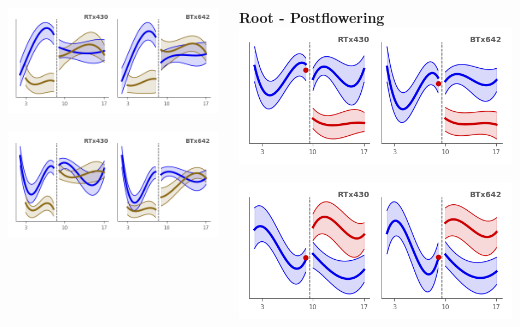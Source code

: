 \documentclass[xcolor=dvipsnames]{beamer}
\begin{document}
\begin{frame}
\begin{columns}
\begin{column}{0.3\linewidth}
\includegraphics[width=0.9\linewidth]{figures/clusters/root_Preflowering_1.png}

\includegraphics[width=0.9\linewidth]{figures/clusters/root_Preflowering_18.png}

\end{column}
\begin{column}{0.3\linewidth}
\center
\small
{\bf Root - Postflowering}
\includegraphics[width=0.9\linewidth]{figures/clusters/root_Postflowering_1.png}

\includegraphics[width=0.9\linewidth]{figures/clusters/root_Postflowering_0.png}


\end{column}
\end{columns}
\end{frame}
\end{document}
